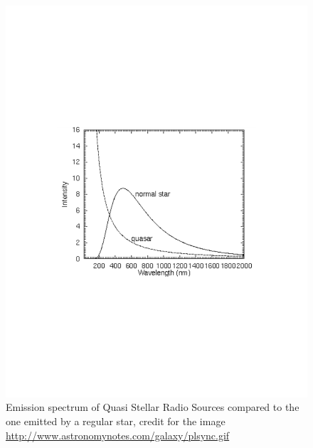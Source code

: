 \begin{figure}
\begin{center}
\includegraphics[scale=0.8]{Draw/quasar_spec_ideal.pdf}
\end{center}
\caption{Emission spectrum of Quasi Stellar Radio Sources compared to the one emitted by a regular star, credit for the image \url{http://www.astronomynotes.com/galaxy/plsync.gif}}
\label{quasarspecideal}
\end{figure} 

